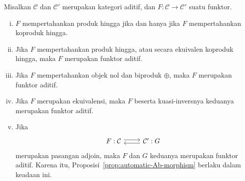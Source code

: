 \begin{korolari}\label{prop:automatic-additivity}
	Misalkan $\mathcal{C}$ dan $\mathcal{C}'$ merupakan kategori aditif, dan
	$F: \mathcal{C} \to \mathcal{C}'$ suatu funktor.
	\begin{enumerate}[(i)]
		\item $F$ mempertahankan produk hingga jika dan hanya jika $F$
		mempertahankan koproduk hingga.
		\item Jika $F$ mempertahankan produk hingga, atau secara ekuivalen
		koproduk hingga, maka $F$ merupakan funktor aditif.
		\item Jika $F$ mempertahankan objek nol dan biproduk $\oplus$, maka $F$
		merupakan funktor aditif.
		\item Jika $F$ merupakan ekuivalensi, maka $F$ beserta kuasi-inversnya
		keduanya merupakan funktor aditif.
		\item Jika
		\[\begin{tikzcd}
			F: \mathcal{C} \arrow[shift left, r] & \mathcal{C}' \arrow[shift left, l] : G
		\end{tikzcd}\]
		merupakan pasangan adjoin, maka $F$ dan $G$ keduanya merupakan funktor
		aditif. Karena itu, Proposisi~\ref{prop:automatic-Ab-morphism} berlaku
		dalam keadaan ini.
	\end{enumerate}
\end{korolari}

